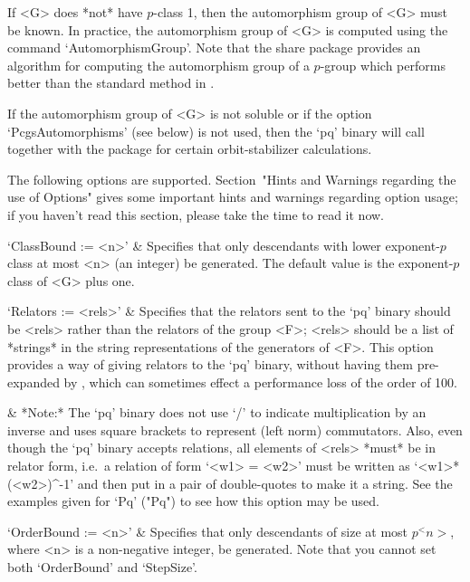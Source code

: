 If <G> does *not* have $p$-class 1, then the automorphism  group  of  <G>
must be known. In practice, the automorphism group  of  <G>  is  computed
using the {\GAP} command `AutomorphismGroup'. Note that the {\GAP}  share
package {\AutPGrp} provides an algorithm for computing  the  automorphism
group of a $p$-group which performs better than the  standard  method  in
{\GAP}.

If the automorphism group  of  <G>  is  not  soluble  or  if  the  option
`PcgsAutomorphisms' (see below) is not used, then the  `pq'  binary  will
call  {\GAP}  together  with   the   {\AutPGrp}   package   for   certain
orbit-stabilizer calculations.

The  following  options  are  supported.  Section~"Hints   and   Warnings
regarding the use of Options" gives some  important  hints  and  warnings
regarding option usage; if you haven't read this section, please take the
time to read it now.

\beginitems

`ClassBound := <n>' &
Specifies that only descendants with lower exponent-$p$ class at most <n>
(an integer) be generated. The default value is the exponent-$p$ class of
<G> plus one.

`Relators := <rels>' &
Specifies that the relators sent to the  `pq'  binary  should  be  <rels>
rather than the relators of the group <F>; <rels> should  be  a  list  of
*strings* in the string representations of the generators  of  <F>.  This
option provides a way of giving relators  to  the  `pq'  binary,  without
having  them  pre-expanded  by  {\GAP},  which  can  sometimes  effect  a
performance loss of the order of 100.

&
*Note:*
The `pq' binary does not use `/' to indicate multiplication by an inverse
and uses square brackets to represent (left norm) commutators. Also, even
though the `pq' binary accepts relations, all elements of  <rels>  *must*
be in relator form, i.e.~a relation of form `<w1> = <w2>' must be written
as `<w1>*(<w2>)^-1' and then put in a pair of double-quotes to make it  a
string. See the examples given for `Pq' ("Pq") to see how this option may
be used.

`OrderBound := <n>' &
Specifies that only descendants of size at most $p^<n>$, where <n>  is  a
non-negative integer,  be  generated.  Note  that  you  cannot  set  both
`OrderBound' and `StepSize'.

